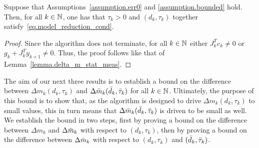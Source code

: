 \begin{lemma}\label{lemma.well_defined}
  Suppose that Assumptions~\ref{assumption.err0} and \ref{assumption.bounded} hold.  Then, for all $k \in \mathbb{N}$, one has that $\tau_k > 0$ and $(d_k,\tau_k)$ together satisfy~\eqref{eq.model_reduction_cond}.
\end{lemma}
\begin{proof}
  Since the algorithm does not terminate, for all $k \in \mathbb{N}$ either $J_k^Tc_k \neq 0$ or $g_k + J_k^Ty_{k+1} \neq 0$.  Thus, the proof follows like that of Lemma~\ref{lemma.delta_m_stat_meas}.
\end{proof}

The aim of our next three results is to establish a bound on the difference between $\Delta m_k(d_k,\tau_k)$ and $\Delta {\bar m}_k({\bar d}_k,{\bar \tau}_k)$ for all $k \in \mathbb{N}$.  Ultimately, the purpose of this bound is to show that, as the algorithm is designed to drive $\Delta m_k(d_k,\tau_k)$ to small values, this in turn means that $\Delta {\bar m}_k({\bar d}_k,{\bar \tau}_k)$ is driven to be small as well.  We establish the bound in two steps, first by proving a bound on the difference between $\Delta m_k$ and $\Delta {\bar m}_k$ with respect to $(d_k,\tau_k)$, then by proving a bound on the difference between $\Delta {\bar m}_k$ with respect to $(d_k,\tau_k)$ and $({\bar d}_k,{\bar \tau}_k)$.

